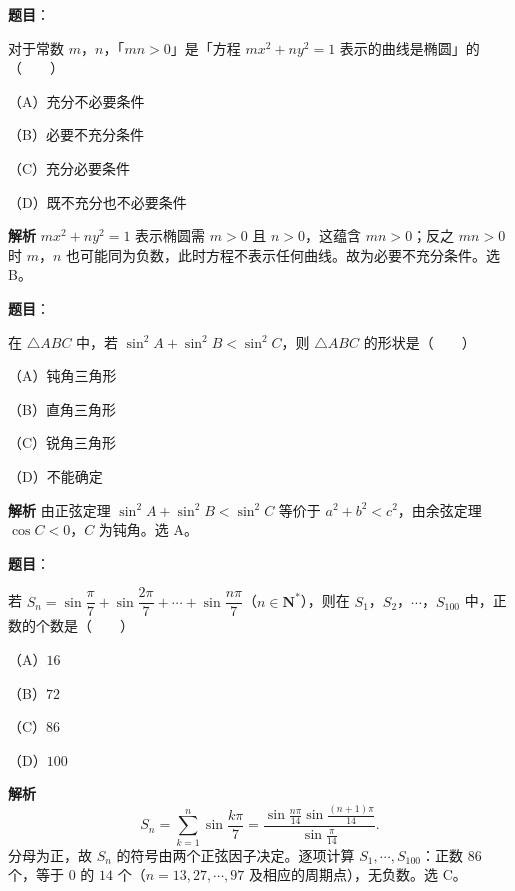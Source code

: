 \begin{answer}

\textbf{题目}：

对于常数 $m$，$n$，「$mn>0$」是「方程 $mx^2+ny^2=1$ 表示的曲线是椭圆」的\mbox{（　　）}

（A）充分不必要条件

（B）必要不充分条件

（C）充分必要条件

（D）既不充分也不必要条件

\textbf{解析}
$mx^2+ny^2=1$ 表示椭圆需 $m>0$ 且 $n>0$，这蕴含 $mn>0$；反之 $mn>0$ 时 $m$，$n$ 也可能同为负数，此时方程不表示任何曲线。故为必要不充分条件。选 B。


\end{answer}
\begin{answer}

\textbf{题目}：

在 $\triangle ABC$ 中，若 $\sin^2A+\sin^2B<\sin^2C$，则 $\triangle ABC$ 的形状是\mbox{（　　）}

（A）钝角三角形

（B）直角三角形

（C）锐角三角形

（D）不能确定

\textbf{解析}
由正弦定理 $\sin^2A+\sin^2B<\sin^2C$ 等价于 $a^2+b^2<c^2$，由余弦定理 $\cos C<0$，$C$ 为钝角。选 A。


\end{answer}
\begin{answer}

\textbf{题目}：

若 $S_n=\sin\dfrac\pi7+\sin\dfrac{2\pi}7+\cdots+\sin\dfrac{n\pi}7$（$n\in\mathbf N^*$），则在 $S_1$，$S_2$，$\cdots$，$S_{100}$ 中，正数的个数是\mbox{（　　）}

（A）$16$

（B）$72$

（C）$86$

（D）$100$

\textbf{解析}
\nopagebreak[4]
\[S_n=\sum_{k=1}^n\sin\frac{k\pi}7=\frac{\sin\frac{n\pi}{14}\sin\frac{(n+1)\pi}{14}}{\sin\frac\pi{14}}.\]
分母为正，故 $S_n$ 的符号由两个正弦因子决定。逐项计算 $S_1,\cdots,S_{100}$：正数 $86$ 个，等于 $0$ 的 $14$ 个（$n=13,27,\cdots,97$ 及相应的周期点），无负数。选 C。


\end{answer}
